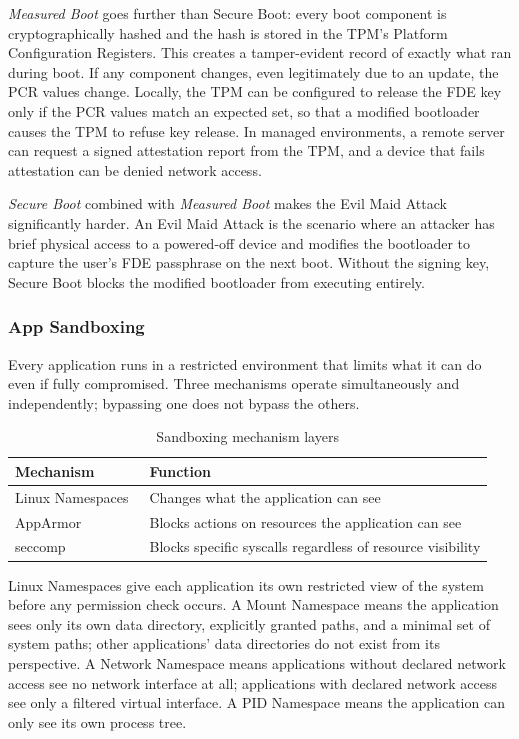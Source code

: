 \emph{Measured Boot} goes further than Secure Boot: every boot component is
cryptographically hashed and the hash is stored in the TPM's Platform
Configuration Registers. This creates a tamper-evident record of exactly what
ran during boot. If any component changes, even legitimately due to an update,
the PCR values change. Locally, the TPM can be configured to release the FDE
key only if the PCR values match an expected set, so that a modified bootloader
causes the TPM to refuse key release. In managed environments, a remote server
can request a signed attestation report from the TPM, and a device that fails
attestation can be denied network access.

\emph{Secure Boot} combined with \emph{Measured Boot} makes the Evil Maid
Attack significantly harder. An Evil Maid Attack is the scenario where an
attacker has brief physical access to a powered-off device and modifies the
bootloader to capture the user's FDE passphrase on the next boot. Without
the signing key, Secure Boot blocks the modified bootloader from executing
entirely.

\subsubsection{App Sandboxing}
\label{sec:sandboxing}

Every application runs in a restricted environment that limits what it can do
even if fully compromised. Three mechanisms operate simultaneously and
independently; bypassing one does not bypass the others.

\begin{table}[htbp]
\caption{Sandboxing mechanism layers}
\label{tab:sandboxing}
\begin{tabularx}{\linewidth}{lX}
\toprule
\textbf{Mechanism} & \textbf{Function} \\
\midrule
Linux Namespaces~\cite{archwiki:namespaces} & Changes what the application can see \\
AppArmor~\cite{archwiki:apparmor}           & Blocks actions on resources the application can see \\
seccomp~\cite{archwiki:seccomp}             & Blocks specific syscalls regardless of resource visibility \\
\bottomrule
\end{tabularx}
\end{table}

Linux Namespaces give each application its own restricted view of the system
before any permission check occurs. A Mount Namespace means the application
sees only its own data directory, explicitly granted paths, and a minimal set
of system paths; other applications' data directories do not exist from its
perspective. A Network Namespace means applications without declared network
access see no network interface at all; applications with declared network
access see only a filtered virtual interface. A PID Namespace means the
application can only see its own process tree.

